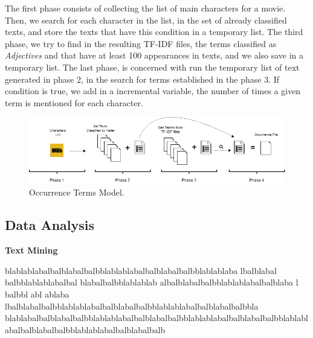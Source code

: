 The first phase consists of collecting the list of main characters for a movie. Then, we search for each character in the list, in the set of already classified texts, and store the texts that have this condition in a temporary list. The third phase, we try to find in the resulting TF-IDF files, the terms classified as \textit{Adjectives} and that have at least 100 appearances in texts, and we also save in a temporary list. The last phase, is concerned with run the temporary list of text generated in phase 2, in the search for terms established in the phase 3. If condition is true, we add in a incremental variable, the number of times a given term is mentioned for each character. 

\begin{figure}[btp]
\begin{center}
\includegraphics[width=0.8\linewidth]{img/diagrama-ocorrencia-movie.png}
\end{center}
   \caption{Occurrence Terms Model.}
\label{fig:phases}
\end{figure}


\subsection{Data Analysis}

\textbf{Text Mining}

blablablabalbalblabalbalbblablablabalbalblabalbalbblablablaba lbalblabal balbblablablabalbal blabalbalbblablablab albalblabalbalbblablablabalbalblaba l balbbl abl ablaba lbalblabalbalbblablablabalbalblabalbalbblablablabalbalblabalbalbbla blablabalbalblabalbalbblablablabalbalblabalbalbblablablabalbalblabalbalbblablablabalbalblabalbalbblablablabalbalblabalbalb

